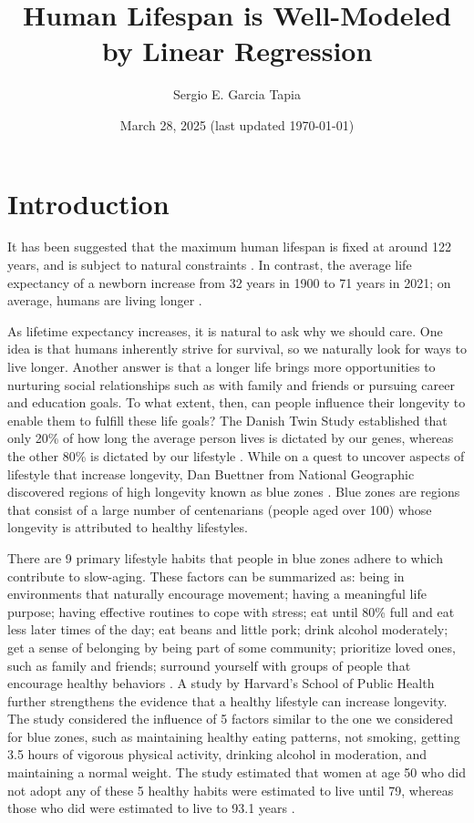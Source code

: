 \documentclass[12pt]{article}
\title{Human Lifespan is Well-Modeled by Linear Regression}
\author{Sergio E. Garcia Tapia}
\date{March 28, 2025 (last updated \today)}
\begin{document}
	\maketitle
	\section{Introduction}
	It has been suggested that the maximum human lifespan is fixed at around
	122 years, and is subject to natural constraints \cite{NLoM-maximal-lifespan}.
	In contrast, the average life expectancy of a newborn increase from 32 years in 1900 to
	71 years in 2021; on average, humans are living longer \cite{owid-life-expectancy}.
	
	As lifetime expectancy increases, it is natural to ask why we should care.
	One idea is that humans inherently strive for survival, so we naturally look
	for ways to live longer. Another answer is that a longer life brings more
	opportunities to nurturing social relationships such as with family and friends
	or pursuing career and education goals. To what extent, then, can people influence their
	longevity to enable them to fulfill these life goals? The Danish Twin Study
	established that only 20\% of how long the average person lives is dictated by our
	genes, whereas the other 80\% is dictated by our lifestyle \cite{PMC-blue-zones}.
	While on a quest to uncover aspects of lifestyle that increase longevity,
	Dan Buettner from National Geographic discovered regions of high longevity known
	as blue zones \cite{PMC-blue-zones}. Blue zones are regions that consist of a large
	number of centenarians (people aged over 100) whose longevity is attributed to healthy
	lifestyles.
	
	There are 9 primary lifestyle habits that people in blue zones adhere to which
	contribute to slow-aging. These factors can be summarized as: being in environments that
	naturally encourage movement; having a meaningful life purpose; having effective routines to
	cope with stress; eat until 80\% full and eat less later times of the day; eat beans
	and little pork; drink alcohol moderately; get a sense of belonging by being part of
	some community; prioritize loved ones, such as family and friends; surround yourself with
	groups of people that encourage healthy behaviors \cite{PMC-blue-zones}.
	A study by Harvard's School of Public Health further strengthens the evidence
	that a healthy lifestyle can increase longevity. The study considered the influence
	of 5 factors similar to the one we considered for blue zones, such as maintaining
	healthy eating patterns, not smoking, getting 3.5 hours of vigorous physical
	activity, drinking alcohol in moderation, and maintaining a normal weight.
	The study estimated that women at age 50 who did not adopt any of these 5 healthy
	habits were estimated to live until 79, whereas those who did were estimated to live
	to 93.1 years \cite{NIH-healthy-habits}.
	
\end{document}
